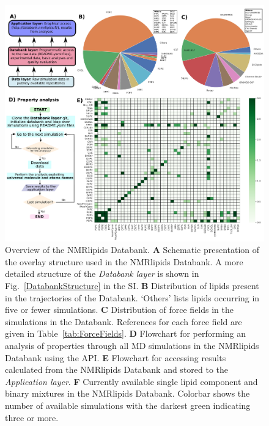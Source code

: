 \documentclass[fleqn,10pt]{wlscirep}
\begin{document}
\begin{figure}[t]
    \centering
    \includegraphics[width=\linewidth]{Figures/overlay4.pdf}
    \caption{Overview of the NMRlipids Databank. 
    \textbf{A} Schematic presentation of the overlay structure used in the NMRlipids Databank. A more detailed structure of the \textit{Databank layer} is shown in Fig.~\ref{DatabankStructure} in the SI.
    \textbf{B} Distribution of lipids present in the trajectories of the Databank. `Others' lists lipids occurring in five or fewer simulations. 
    \textbf{C} Distribution of force fields in the simulations in the Databank. References for each force field are given in Table~\ref{tab:ForceFields}.
    \textbf{D} Flowchart for performing an analysis of properties through all MD simulations in the NMRlipids Databank using the API.
    \textbf{E} Flowchart for accessing results calculated from the NMRlipids Databank and stored to the \textit{Application layer}.
    \textbf{F} Currently available single lipid component and binary mixtures in the NMRlipids Databank. Colorbar shows the number of available simulations with the darkest green indicating three or more.  
    }
    \label{fig:overlay}
\end{figure}
\end{document}
